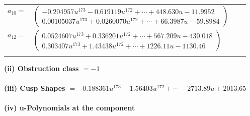 \documentclass[1p]{elsarticle_modified}
\theoremstyle{definition}
\begin{document}
\begin{tabular}{m{7pt} m{180pt} m{7pt} m{180pt} }
\flushright $a_{10}=$&$\begin{pmatrix}-0.204957 u^{173}-0.619119 u^{172}+\cdots+448.630 u-11.9952\\0.00105037 u^{173}+0.0260070 u^{172}+\cdots+66.3987 u-59.8984\end{pmatrix}$ \\
\flushright $a_{12}=$&$\begin{pmatrix}0.0524607 u^{173}+0.336201 u^{172}+\cdots+567.209 u-430.018\\0.303407 u^{173}+1.43438 u^{172}+\cdots+1226.11 u-1130.46\end{pmatrix}$\\&\end{tabular}
\flushleft \textbf{(ii) Obstruction class $= -1$}\\~\\
\flushleft \textbf{(iii) Cusp Shapes $= -0.188361 u^{173}-1.56403 u^{172}+\cdots-2713.89 u+2013.65$}\\~\\
\newpage\renewcommand{\arraystretch}{1}
\flushleft \textbf{(iv) u-Polynomials at the component}\newline \\
\end{document}
